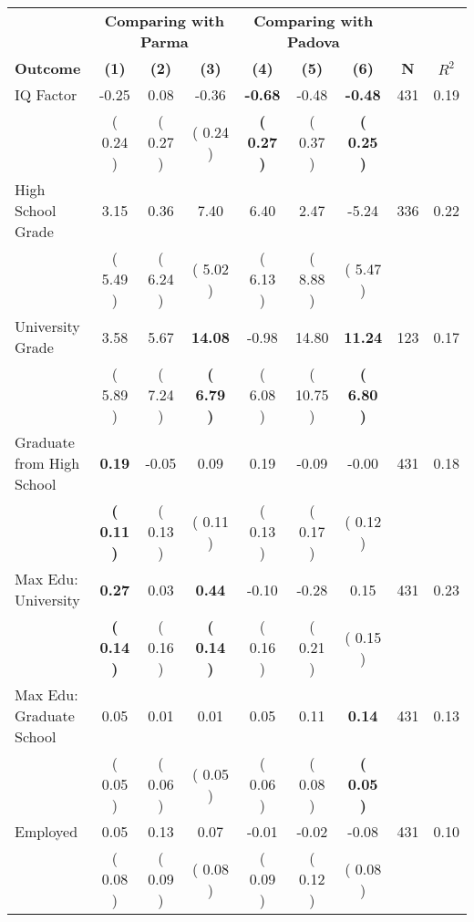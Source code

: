 \begin{tabular}{lcccccccc}
\toprule
 & \multicolumn{3}{c}{\textbf{Comparing with Parma}} & \multicolumn{3}{c}{\textbf{Comparing with Padova}} & \\
\cmidrule(lr){2-4} \cmidrule(lr){5-7} 
 \textbf{Outcome} & \textbf{(1)} & \textbf{(2)} & \textbf{(3)} & \textbf{(4)} & \textbf{(5)} & \textbf{(6)} & \textbf{N} & \textbf{$ R^2$} \\
\midrule
IQ Factor &     -0.25 &      0.08 &     -0.36 & \textbf{    -0.68} &     -0.48 & \textbf{    -0.48} & 431 &       0.19 \\ 
 & (     0.24 ) & (     0.27 ) & (     0.24 ) & \textbf{(     0.27 )} & (     0.37 ) & \textbf{(     0.25 )} & \\
High School Grade &      3.15 &      0.36 &      7.40 &      6.40 &      2.47 &     -5.24 & 336 &       0.22 \\ 
 & (     5.49 ) & (     6.24 ) & (     5.02 ) & (     6.13 ) & (     8.88 ) & (     5.47 ) & \\
University Grade &      3.58 &      5.67 & \textbf{    14.08} &     -0.98 &     14.80 & \textbf{    11.24} & 123 &       0.17 \\ 
 & (     5.89 ) & (     7.24 ) & \textbf{(     6.79 )} & (     6.08 ) & (    10.75 ) & \textbf{(     6.80 )} & \\
Graduate from High School & \textbf{     0.19} &     -0.05 &      0.09 &      0.19 &     -0.09 &     -0.00 & 431 &       0.18 \\ 
 & \textbf{(     0.11 )} & (     0.13 ) & (     0.11 ) & (     0.13 ) & (     0.17 ) & (     0.12 ) & \\
Max Edu: University & \textbf{     0.27} &      0.03 & \textbf{     0.44} &     -0.10 &     -0.28 &      0.15 & 431 &       0.23 \\ 
 & \textbf{(     0.14 )} & (     0.16 ) & \textbf{(     0.14 )} & (     0.16 ) & (     0.21 ) & (     0.15 ) & \\
Max Edu: Graduate School &      0.05 &      0.01 &      0.01 &      0.05 &      0.11 & \textbf{     0.14} & 431 &       0.13 \\ 
 & (     0.05 ) & (     0.06 ) & (     0.05 ) & (     0.06 ) & (     0.08 ) & \textbf{(     0.05 )} & \\
Employed &      0.05 &      0.13 &      0.07 &     -0.01 &     -0.02 &     -0.08 & 431 &       0.10 \\ 
 & (     0.08 ) & (     0.09 ) & (     0.08 ) & (     0.09 ) & (     0.12 ) & (     0.08 ) & \\

\end{tabular}
